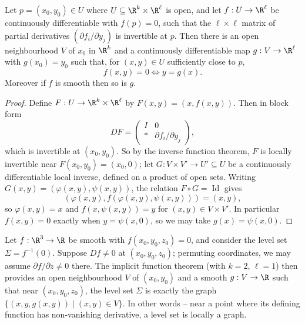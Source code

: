 \begin{theorem}
    Let $p = (x_0, y_0) \in U$ where $U \subseteq \R^k \times \R^\ell$ is open, and let $f: U \rightarrow \R^\ell$ be continuously differentiable with $f(p) = 0$, such that the $\ell \times \ell$ matrix of partial derivatives $\left(\partial f_i/\partial y_j\right)$ is invertible at $p$. Then there is an open neighbourhood $V$ of $x_0$ in $\R^k$ and a continuously differentiable map $g: V \rightarrow \R^\ell$ with $g(x_0) = y_0$ such that, for $(x, y) \in U$ sufficiently close to $p$,
    $$
    f(x, y) = 0 \iff y = g(x).
    $$
    Moreover if $f$ is smooth then so is $g$.
\end{theorem}
\begin{proof}
    Define $F: U \rightarrow \R^k \times \R^\ell$ by $F(x, y) = (x, f(x, y))$. Then in block form
    $$
    DF = \begin{pmatrix}
        I & 0 \\ * & \partial f_i/\partial y_j
    \end{pmatrix},
    $$
    which is invertible at $(x_0, y_0)$. So by the inverse function theorem, $F$ is locally invertible near $F(x_0, y_0) = (x_0, 0)$; let $G: V \times V' \rightarrow U' \subseteq U$ be a continuously differentiable local inverse, defined on a product of open sets. Writing $G(x, y) = (\varphi(x, y), \psi(x, y))$, the relation $F \circ G = \operatorname{Id}$ gives
    $$
    (\varphi(x, y), f(\varphi(x,y), \psi(x, y))) = (x, y),
    $$
    so $\varphi(x, y) = x$ and $f(x, \psi(x, y)) = y$ for $(x, y) \in V \times V'$.
    In particular $f(x, y) = 0$ exactly when $y = \psi(x, 0)$, so we may take $g(x) = \psi(x, 0)$.
\end{proof}

\begin{example}
    Let $f: \R^3 \rightarrow \R$ be smooth with $f(x_0, y_0, z_0) = 0$, and consider the level set $\Sigma = f^{-1}(0)$. Suppose $Df \neq 0$ at $(x_0, y_0, z_0)$; permuting coordinates, we may assume $\partial f/\partial z \neq 0$ there. The implicit function theorem (with $k = 2$, $\ell = 1$) then provides an open neighbourhood $V$ of $(x_0, y_0)$ and a smooth $g: V \rightarrow \R$ such that near $(x_0, y_0, z_0)$, the level set $\Sigma$ is exactly the graph $\{(x, y, g(x, y)) \mid (x, y) \in V\}$. In other words -- near a point where its defining function has non-vanishing derivative, a level set is locally a graph.
\end{example}

